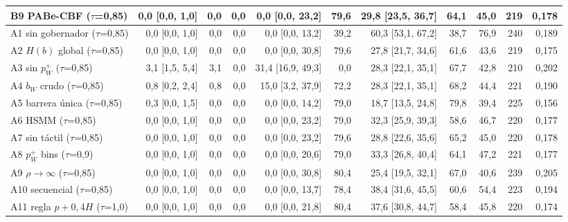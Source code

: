 \begin{table}[!t]
{\begin{tabular}{lrrrrrrrrrr}
B9 PABe-CBF ($\tau$=0{,}85) & 0{,}0 \scriptsize[0{,}0, 1{,}0] & 0{,}0 & 0{,}0 & 0{,}0 \scriptsize[0{,}0, 23{,}2] & 79{,}6 & 29{,}8 \scriptsize[23{,}5, 36{,}7] & 64{,}1 & 45{,}0 & 219 & 0{,}178 \\
\midrule
A1 sin gobernador ($\tau$=0{,}85) & 0{,}0 \scriptsize[0{,}0, 1{,}0] & 0{,}0 & 0{,}0 & 0{,}0 \scriptsize[0{,}0, 13{,}2] & 39{,}2 & 60{,}3 \scriptsize[53{,}1, 67{,}2] & 38{,}7 & 76{,}9 & 240 & 0{,}189 \\
A2 $H(b)$ global ($\tau$=0{,}85) & 0{,}0 \scriptsize[0{,}0, 1{,}0] & 0{,}0 & 0{,}0 & 0{,}0 \scriptsize[0{,}0, 30{,}8] & 79{,}6 & 27{,}8 \scriptsize[21{,}7, 34{,}6] & 61{,}6 & 43{,}6 & 219 & 0{,}175 \\
A3 sin $p_W^+$ ($\tau$=0{,}85) & 3{,}1 \scriptsize[1{,}5, 5{,}4] & 3{,}1 & 0{,}0 & 31{,}4 \scriptsize[16{,}9, 49{,}3] & 0{,}0 & 28{,}3 \scriptsize[22{,}1, 35{,}1] & 67{,}7 & 42{,}8 & 210 & 0{,}202 \\
A4 $b_W$ crudo ($\tau$=0{,}85) & 0{,}8 \scriptsize[0{,}2, 2{,}4] & 0{,}8 & 0{,}0 & 15{,}0 \scriptsize[3{,}2, 37{,}9] & 72{,}2 & 28{,}3 \scriptsize[22{,}1, 35{,}1] & 68{,}2 & 44{,}4 & 221 & 0{,}190 \\
A5 barrera única ($\tau$=0{,}85) & 0{,}3 \scriptsize[0{,}0, 1{,}5] & 0{,}0 & 0{,}0 & 0{,}0 \scriptsize[0{,}0, 14{,}2] & 79{,}0 & 18{,}7 \scriptsize[13{,}5, 24{,}8] & 79{,}8 & 39{,}4 & 225 & 0{,}156 \\
A6 HSMM ($\tau$=0{,}85) & 0{,}0 \scriptsize[0{,}0, 1{,}0] & 0{,}0 & 0{,}0 & 0{,}0 \scriptsize[0{,}0, 23{,}2] & 79{,}0 & 32{,}3 \scriptsize[25{,}9, 39{,}3] & 58{,}6 & 46{,}7 & 220 & 0{,}177 \\
A7 sin táctil ($\tau$=0{,}85) & 0{,}0 \scriptsize[0{,}0, 1{,}0] & 0{,}0 & 0{,}0 & 0{,}0 \scriptsize[0{,}0, 23{,}2] & 79{,}6 & 28{,}8 \scriptsize[22{,}6, 35{,}6] & 65{,}2 & 45{,}0 & 220 & 0{,}178 \\
A8 $p_W^+$ bins ($\tau$=0{,}9) & 0{,}0 \scriptsize[0{,}0, 1{,}0] & 0{,}0 & 0{,}0 & 0{,}0 \scriptsize[0{,}0, 20{,}6] & 79{,}0 & 33{,}3 \scriptsize[26{,}8, 40{,}4] & 64{,}1 & 47{,}2 & 221 & 0{,}177 \\
A9 $\rho\to\infty$ ($\tau$=0{,}85) & 0{,}0 \scriptsize[0{,}0, 1{,}0] & 0{,}0 & 0{,}0 & 0{,}0 \scriptsize[0{,}0, 30{,}8] & 80{,}4 & 25{,}4 \scriptsize[19{,}5, 32{,}1] & 67{,}0 & 40{,}6 & 239 & 0{,}205 \\
A10 secuencial ($\tau$=0{,}85) & 0{,}0 \scriptsize[0{,}0, 1{,}0] & 0{,}0 & 0{,}0 & 0{,}0 \scriptsize[0{,}0, 13{,}7] & 78{,}4 & 38{,}4 \scriptsize[31{,}6, 45{,}5] & 60{,}6 & 54{,}4 & 223 & 0{,}194 \\
A11 regla $p+0{,}4H$ ($\tau$=1{,}0) & 0{,}0 \scriptsize[0{,}0, 1{,}0] & 0{,}0 & 0{,}0 & 0{,}0 \scriptsize[0{,}0, 21{,}8] & 80{,}4 & 37{,}6 \scriptsize[30{,}8, 44{,}7] & 58{,}4 & 45{,}8 & 220 & 0{,}174 \\
\bottomrule
\end{tabular}}
\end{table}
